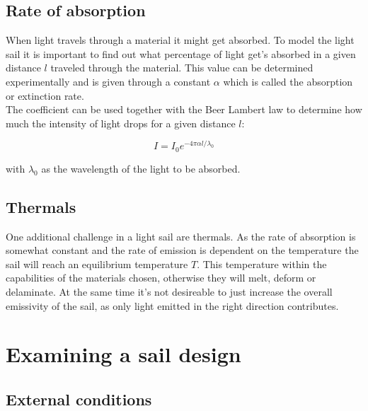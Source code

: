 \documentclass[14pt]{article}
\begin{document}
\subsection{Rate of absorption}
When light travels through a material it might get absorbed. To model the light sail it is important to find out what percentage of light get's
absorbed in a given distance $l$ traveled through the material. This value can be determined experimentally and is given through a constant
$\alpha$ which is called the absorption or extinction rate. 
\\
The coefficient can be used together with the Beer Lambert law to determine how much the intensity of light drops for a given distance $l$:

\begin{equation}
  I = I_0 e^{- 4 \pi \alpha l / \lambda_0 }
  \label{eq:absorption}
\end{equation}


with $\lambda_0$ as the wavelength of the light to be absorbed.

\subsection{Thermals}

One additional challenge in a light sail are thermals. As the rate of absorption is somewhat constant and the rate of emission is dependent on the temperature
the sail will reach an equilibrium temperature $T$. This temperature within the capabilities of the materials chosen, otherwise they will melt, deform or
delaminate. At the same time it's not desireable to just increase the overall emissivity of the sail, as only light emitted in the right direction contributes.

\section{Examining a sail design}

\subsection{External conditions}
\end{document}
